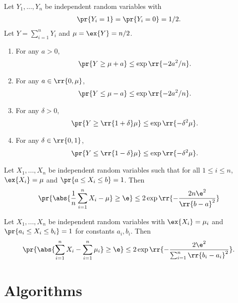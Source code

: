 \documentclass{article}
\begin{document}
\begin{corollary}
  Let $Y_1,...,Y_n$ be independent random variables with
  \begin{align*}
    \pr{Y_i=1}=\pr{Y_i=0}=1/2.
  \end{align*}
  Let $Y=\sum_{i=1}^{n} Y_i$ and $\mu=\ex{Y}=n/2$.
  \begin{enumerate}
    \item For any $a>0$, \begin{align*}
        \pr{Y\geq \mu+a}\leq \exp\rr{-2a^2/n}.
      \end{align*}
    \item For any $a\in\rr{0,\mu}$, \begin{align*}
        \pr{Y\leq \mu-a}\leq \exp\rr{-2a^2/n}.
      \end{align*}
    \item For any $\delta>0$, \begin{align*}
        \pr{Y\geq \rr{1+\delta}\mu}\leq \exp\rr{-\delta^2\mu}.
      \end{align*}
    \item For any $\delta\in\rr{0,1}$, \begin{align*}
        \pr{Y\leq \rr{1-\delta}\mu}\leq \exp\rr{-\delta^2\mu}.
      \end{align*}
  \end{enumerate}
\end{corollary}

\begin{theorem}
  Let $X_1,...,X_n$ be independent random variables such that for all $1\leq i\leq n$,
  $\ex{X_i}=\mu$ and $\pr{a\leq X_i\leq b}=1$. Then
  \begin{align*}
    \pr{\abs{\frac{1}{n}\sum_{i=1}^{n} X_i-\mu}\geq \e}\leq 2\exp\rr{-\frac{2n\e^2}{\rr{b-a}^2}}
  \end{align*}
\end{theorem}

\begin{theorem}
  Let $X_1,...,X_n$ be independent random variables with $\ex{X_i}=\mu_i$ and $\pr{a_i\leq X_i\leq b_i}=1$ for
  constants $a_i,b_i$. Then
  \begin{align*}
    \pr{\abs{\sum_{i=1}^{n} X_i - \sum_{i=1}^{n} \mu_i}\geq\e} \leq 2\exp\rr{-\frac{2\e^2}{\sum_{i=1}^{n} \rr{b_i-a_i}^2}}.
  \end{align*}
\end{theorem}

\section{Algorithms}
\label{sec:algorithms}
\end{document}
